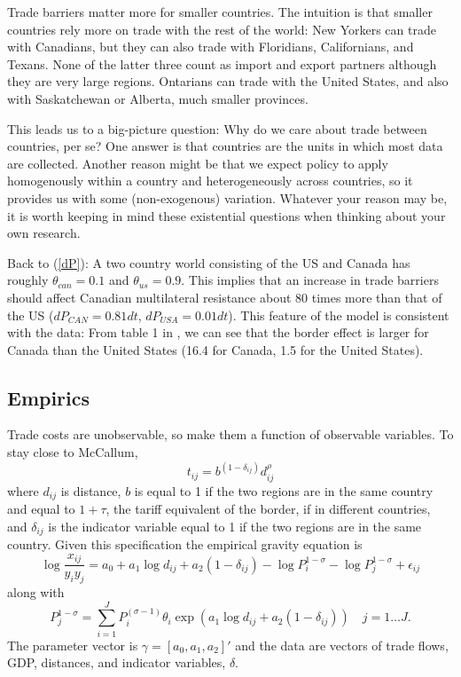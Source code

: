 \documentclass[11pt, pdftex]{article}
\newcommand{\sig}{\sigma}
\begin{document}
Trade barriers matter more for smaller countries. The intuition is that smaller countries rely more on trade with the rest of the world: New Yorkers can trade with Canadians, but they can also trade with Floridians, Californians, and Texans. None of the latter three count as import and export partners although they are very large regions. Ontarians can trade with the United States, and also with Saskatchewan or Alberta, much smaller provinces.

This leads us to a big-picture question: Why do we care about trade between countries, per se?  One answer is that countries are the units in which most data are collected.  Another reason might be that we expect policy to apply homogenously within a country and heterogeneously across countries, so it provides us with some (non-exogenous) variation. Whatever your reason may be, it is worth keeping in mind these existential questions  when thinking about your own research.

Back to (\ref{dP}): A two country world consisting of the US and Canada has roughly $\theta_{can}=0.1$ and $\theta_{us}=0.9$.  This implies that an increase in trade barriers should affect Canadian multilateral resistance about 80 times more than that of the US ($d P_{CAN}=0.81 dt$, $d P_{USA}=0.01 dt$). This feature of the model is consistent with the data: From table 1 in \citet{andersonVanwin}, we can see that the border effect is larger for Canada than the United States (16.4 for Canada, 1.5 for the United States).

\subsection*{Empirics}
Trade costs are unobservable, so make them a function of observable variables.  To stay close to McCallum,
\begin{equation}
t_{ij}=b^{(1-\delta_{ij})}d_{ij}^\rho
\end{equation}
where $d_{ij}$ is distance, $b$ is equal to 1 if the two regions are in the same country and equal to $1+\tau$, the tariff equivalent of the border, if in different countries, and $\delta_{ij}$ is the indicator variable equal to 1 if the two regions are in the same country.  Given this specification the empirical gravity equation is
\begin{equation}
\label{eq:gravity}
\log\frac{x_{ij}}{y_iy_j}=a_0+a_1\log d_{ij} +a_2(1-\delta_{ij})-\log P_i^{1-\sig}-\log P_j^{1-\sig}+\epsilon_{ij}
\end{equation}
along with
\begin{equation}
\label{eq:mr}
P_{j}^{1-\sig}=\sum_{i=1}^J P_{i}^{(\sigma-1)}\theta_i \exp\left(a_1 \log d_{ij} +a_2\left(1-\delta_{ij}\right)\right) \quad j=1 \dots J.
\end{equation}
The parameter vector is $\gamma=[a_0,a_1,a_2]'$ and the data are vectors of trade flows, GDP, distances, and indicator variables, $\delta$.
\end{document}
